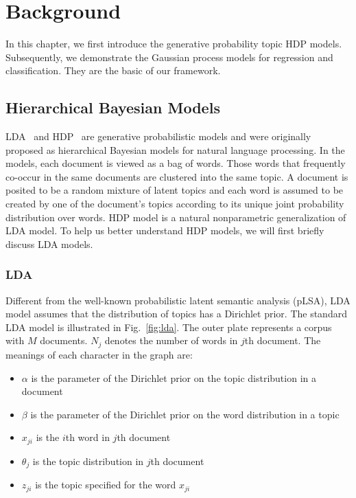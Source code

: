 \chapter{Background}
\label{chap:bg}
In this chapter, we first introduce the generative probability topic HDP models. Subsequently, we demonstrate the Gaussian process models for regression and classification.
They are the basic of our framework.

\section{Hierarchical Bayesian Models}
\label{bg:hbm}
LDA~\cite{blei2003latent} and HDP~\cite{teh2006hdp} are generative probabilistic models and were originally proposed as hierarchical Bayesian models for natural language processing. 
In the models, each document is viewed as a bag of words. Those words that frequently co-occur in the same documents are clustered into the same topic. A document is posited to be a random mixture of latent topics and each word is assumed to be created by one of the document's topics according to its unique joint probability distribution over words. 
HDP model is a natural nonparametric generalization of LDA model. To help us better understand HDP models, we will first briefly discuss LDA models.

\subsection{LDA}
\label{bg:lda}
Different from the well-known probabilistic latent semantic analysis (pLSA), LDA model assumes that the distribution of topics has a Dirichlet prior. The standard LDA model is illustrated in Fig.~\ref{fig:lda}. The outer plate represents a corpus with $M$ documents. $N_j$ denotes the number of words in $j$th document. The meanings of each character in the graph are:

\begin{itemize}
	\item[]$\alpha$ is the parameter of the Dirichlet prior on the topic distribution in a document
	\item[]$\beta$ is the parameter of the Dirichlet prior on the word distribution in a topic
	\item[]$x_{ji}$ is the $i$th word in $j$th document
	\item[]$\theta_j$ is the topic distribution in $j$th document
	\item[]$z_{ji}$ is the topic specified for the word  $x_{ji}$
\end{itemize}

